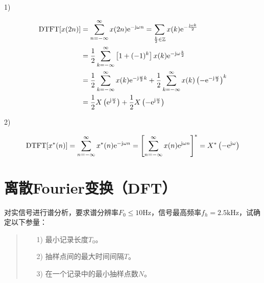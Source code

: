 \documentclass[cn, hazy, blue, normal, 14pt]{elegantnote}
\begin{document}
\begin{solution}[print=true]

1) 

\begin{equation}
\notag
\begin{aligned}
    \text{DTFT}[x(2n)]&=\sum_{n=-\infty}^{\infty}x(2n)\text{e}^{-\text{j}\omega n}=\sum_{\frac{k}{2}\in\mathbb{Z}}x(k)\text{e}^{-\frac{\text{j}\omega k}{2}} \\
    &=\frac{1}{2}\sum_{k=-\infty}^{\infty}\left[1+(-1)^k\right]x(k)\text{e}^{-\text{j}\omega\frac{k}{2}} \\
    &=\frac{1}{2}\sum_{k=-\infty}^{\infty}x(k)\text{e}^{-\text{j}\frac{\omega}{2}k}+\frac{1}{2}\sum_{k=-\infty}^{\infty}x(k)\left(-\text{e}^{-\text{j}\frac{\omega}{2}}\right)^k \\
    &=\frac{1}{2}X\left(\text{e}^{\text{j}\frac{\omega}{2}}\right)+\frac{1}{2}X\left(-\text{e}^{\text{j}\frac{\omega}{2}}\right)
\end{aligned}
\end{equation}

2)

\begin{equation}
\notag
    \text{DTFT}[x^*(n)]=\sum_{n=-\infty}^{\infty}x^*(n)\text{e}^{-\text{j}\omega n}=\left[\sum_{n=-\infty}^{\infty}x(n)\text{e}^{\text{j}\omega n}\right]^*=X^*\left(-\text{e}^{\text{j}\omega}\right)
\end{equation}

\end{solution}


\section{离散Fourier变换（DFT）}


\begin{exercise}

对实信号进行谱分析，要求谱分辨率$F_0\leq 10\text{Hz}$，信号最高频率$f_h=2.5\text{kHz}$，试确定以下参量：

\begin{quote}
\begin{itemize}
    \item[1)] 最小记录长度$T_0$。
    \item[2)] 抽样点间的最大时间间隔$T$。
    \item[3)] 在一个记录中的最小抽样点数$N$。
\end{itemize}
\end{quote}

\end{exercise}
\end{document}
